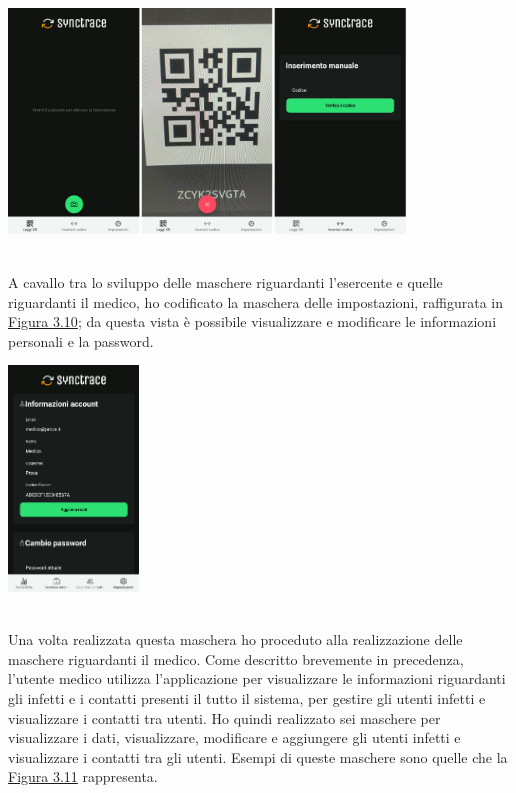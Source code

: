 \begin{minipage}{\linewidth}
  \label{img:es}
  \centering
    \includegraphics[height=6cm]{immagini/app/es}
\end{minipage}\\

A cavallo tra lo sviluppo delle maschere riguardanti l'esercente e quelle riguardanti il medico, ho codificato la maschera delle impostazioni, raffigurata in \hyperref[img:settings]{Figura 3.10}; da questa vista è possibile visualizzare e modificare le informazioni personali e la password. \\

\begin{minipage}{\linewidth}
  \label{img:settings}
  \centering
    \includegraphics[height=6cm]{immagini/app/settings}
\end{minipage}\\

Una volta realizzata questa maschera ho proceduto alla realizzazione delle maschere riguardanti il medico. Come descritto brevemente in precedenza, l'utente medico utilizza l'applicazione per visualizzare le informazioni riguardanti gli infetti e i contatti presenti il tutto il sistema, per gestire gli utenti infetti e visualizzare i contatti tra utenti. Ho quindi realizzato sei maschere per visualizzare i dati, visualizzare, modificare e aggiungere gli utenti infetti e visualizzare i contatti tra gli utenti. Esempi di queste maschere sono quelle che la \hyperref[img:med]{Figura 3.11} rappresenta. \\


